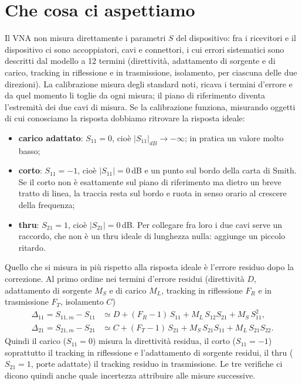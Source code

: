 \documentclass[11pt,a4paper,oneside]{book}
\begin{document}
\section{Che cosa ci aspettiamo}
Il VNA non misura direttamente i parametri $S$ del dispositivo: fra i ricevitori e il dispositivo ci sono accoppiatori, cavi e connettori, i cui errori sistematici sono descritti dal modello a 12 termini (direttività, adattamento di sorgente e di carico, tracking in riflessione e in trasmissione, isolamento, per ciascuna delle due direzioni). La calibrazione misura degli standard noti, ricava i termini d'errore e da quel momento li toglie da ogni misura; il piano di riferimento diventa l'estremità dei due cavi di misura. Se la calibrazione funziona, misurando oggetti di cui conosciamo la risposta dobbiamo ritrovare la risposta ideale:
\begin{itemize}
  \item \textbf{carico adattato}: $S_{11} = 0$, cioè $|S_{11}|_{dB}\to-\infty$; in pratica un valore molto basso;
  \item \textbf{corto}: $S_{11} = -1$, cioè $|S_{11}| = 0$\,dB e un punto sul bordo della carta di Smith. Se il corto non è esattamente sul piano di riferimento ma dietro un breve tratto di linea, la traccia resta sul bordo e ruota in senso orario al crescere della frequenza;
  \item \textbf{thru}: $S_{21} = 1$, cioè $|S_{21}| = 0$\,dB. Per collegare fra loro i due cavi serve un raccordo, che non è un thru ideale di lunghezza nulla: aggiunge un piccolo ritardo.
\end{itemize}
Quello che si misura in più rispetto alla risposta ideale è l'errore residuo dopo la correzione. Al primo ordine nei termini d'errore residui (direttività $D$, adattamento di sorgente $M_S$ e di carico $M_L$, tracking in riflessione $F_R$ e in trasmissione $F_T$, isolamento $C$)
\begin{align}
\Delta_{11} = S_{11,m}-S_{11} &\simeq D + (F_R-1)\,S_{11} + M_L\,S_{12}S_{21} + M_S\,S_{11}^2, \\
\Delta_{21} = S_{21,m}-S_{21} &\simeq C + (F_T-1)\,S_{21} + M_S\,S_{21}S_{11} + M_L\,S_{21}S_{22}.
\end{align}
Quindi il carico ($S_{11} = 0$) misura la direttività residua, il corto ($S_{11} = -1$) soprattutto il tracking in riflessione e l'adattamento di sorgente residui, il thru ($S_{21} = 1$, porte adattate) il tracking residuo in trasmissione. Le tre verifiche ci dicono quindi anche quale incertezza attribuire alle misure successive.
\end{document}
